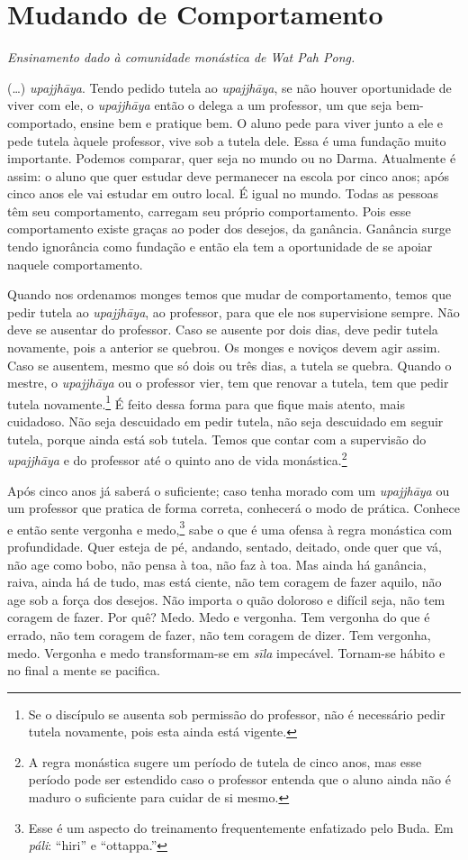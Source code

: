 
\chapter{Mudando de Comportamento}

{\itshape
Ensinamento dado à comunidade monástica de Wat Pah Pong.}

(…) \textit{upajjhāya}. Tendo pedido tutela ao
\textit{upajjhāya}, se não houver oportunidade de viver com ele, o
\textit{upajjhāya} então o delega a um professor, um que seja
bem-comportado, ensine bem e pratique bem. O aluno pede para viver
junto a ele e pede tutela àquele professor, vive sob a tutela dele.
Essa é uma fundação muito importante. Podemos comparar, quer seja no
mundo ou no Darma. Atualmente é assim: o aluno que quer estudar deve
permanecer na escola por cinco anos; após cinco anos ele vai estudar em
outro local. É igual no mundo. Todas as pessoas têm seu comportamento,
carregam seu próprio comportamento. Pois esse comportamento existe
graças ao poder dos desejos, da ganância. Ganância surge tendo
ignorância como fundação e então ela tem a oportunidade de se apoiar
naquele comportamento. 

Quando nos ordenamos monges temos que mudar de comportamento, temos
que pedir tutela ao \textit{upajjhāya}, ao professor, para que ele
nos supervisione sempre. Não deve se ausentar do professor. Caso se
ausente por dois dias, deve pedir tutela novamente, pois a anterior se
quebrou. Os monges e noviços devem agir assim. Caso se ausentem, mesmo
que só dois ou três dias, a tutela se quebra. Quando o mestre, o
\textit{upajjhāya} ou o professor vier, tem que renovar a tutela, tem
que pedir tutela novamente.\footnote{Se o discípulo se ausenta sob
permissão do professor, não é necessário pedir tutela novamente, pois
esta ainda está vigente.} É feito dessa forma para que fique mais
atento, mais cuidadoso. Não seja descuidado em pedir tutela, não seja
descuidado em seguir tutela, porque ainda está sob tutela. Temos que
contar com a supervisão do \textit{upajjhāya} e do professor até o
quinto ano de vida monástica.\footnote{A regra monástica sugere um
período de tutela de cinco anos, mas esse período pode ser estendido
caso o professor entenda que o aluno ainda não é maduro o suficiente
para cuidar de si mesmo.} 

Após cinco anos já saberá o suficiente; caso tenha morado com um
\textit{upajjhāya} ou um professor que pratica de forma correta,
conhecerá o modo de prática. Conhece e então sente vergonha e
medo,\footnote{Esse é um aspecto do treinamento frequentemente
enfatizado pelo Buda. Em \textit{páli}: “hiri” e “ottappa.”} sabe o
que é uma ofensa à regra monástica com profundidade. Quer esteja de pé,
andando, sentado, deitado, onde quer que vá, não age como bobo, não
pensa à toa, não faz à toa. Mas ainda há ganância, raiva, ainda há de
tudo, mas está ciente, não tem coragem de fazer aquilo, não age sob a
força dos desejos. Não importa o quão doloroso e difícil seja, não tem
coragem de fazer. Por quê? Medo. Medo e vergonha. Tem vergonha do que é
errado, não tem coragem de fazer, não tem coragem de dizer. Tem
vergonha, medo. Vergonha e medo transformam-se em \textit{sīla}
impecável. Tornam-se hábito e no final a mente se pacifica. 

